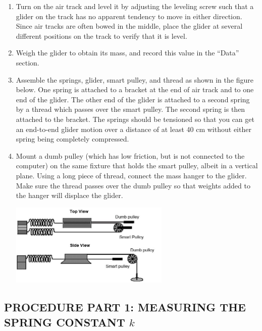 \begin{enumerate}[label=\arabic*.]

\item Turn on the air track and level it by adjusting the leveling screw such that a glider on the track has no apparent tendency to move in either direction.  Since air tracks are often bowed in the middle, place the glider at several different positions on the track to verify that it is level.

\item Weigh the glider to obtain its mass, and record this value in the ``Data'' section.

\item Assemble the springs, glider, smart pulley, and thread as shown in the figure below.  One spring is attached to a bracket at the end of air track and to one end of the glider.  The other end of the glider is attached to a second spring by a thread which passes over the smart pulley.  The second spring is then attached to the bracket.  The springs should be tensioned so that you can get an end-to-end glider motion over a distance of at least 40 cm without either spring being completely compressed.

\item Mount a dumb pulley (which has low friction, but is not connected to the computer) on the same fixture that holds the smart pulley, albeit in a vertical plane.  Using a long piece of thread, connect the mass hanger to the glider.  Make sure the thread passes over the dumb pulley so that weights added to the hanger will displace the glider.
\begin{center} \includegraphics*[width=0.6\textwidth]{imgs/6labs/6Alab/6Aexp4/6A-exp4_fig1_fix.jpg} \end{center}

\end{enumerate}

\subsection*{PROCEDURE PART 1: MEASURING THE SPRING CONSTANT \(k\)}

